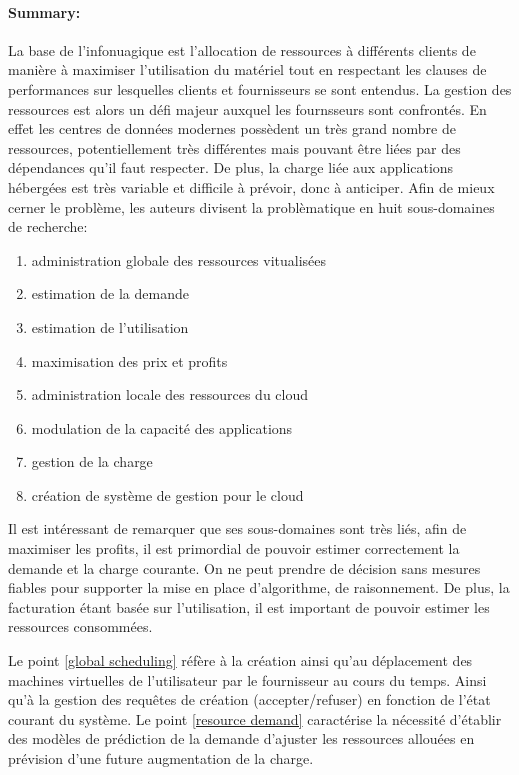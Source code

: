 \documentclass[11pt]{article}
\begin{document}
\paragraph{Summary:}
La base de l'infonuagique est l'allocation de ressources à différents clients de manière à maximiser l'utilisation du matériel tout en respectant les clauses de 
performances sur lesquelles clients et fournisseurs se sont entendus. La gestion des ressources est alors un défi majeur auxquel les fournsseurs sont confrontés. En effet
les centres de données modernes possèdent un très grand nombre de ressources, potentiellement très différentes mais pouvant être liées par des dépendances qu'il faut
respecter. De plus, la charge liée aux applications hébergées est très variable et difficile à prévoir, donc à anticiper. Afin de mieux cerner le problème, les auteurs 
divisent la problèmatique en huit sous-domaines de recherche:
\begin{enumerate}
	\item\label{global scheduling}  administration globale des ressources vitualisées
	\item\label{resource demand}estimation de la demande
	\item\label{resource utilization}estimation de l'utilisation
	\item\label{resource pricing}maximisation des prix et profits
	\item\label{local scheduling}administration locale des ressources du cloud
	\item\label{application scaling}modulation de la capacité des applications
	\item\label{workload management}gestion de la charge
	\item\label{cloud management}création de système de gestion pour le cloud
\end{enumerate}
Il est intéressant de remarquer que ses sous-domaines sont très liés, afin de maximiser les profits, il est primordial de pouvoir estimer correctement la demande et la
charge courante. On ne peut prendre de décision sans mesures fiables pour supporter la mise en place d'algorithme, de raisonnement. De plus, la facturation étant basée 
sur l'utilisation, il est important de pouvoir estimer les ressources consommées.

Le point \ref{global scheduling} réfère à la création ainsi qu'au déplacement des machines virtuelles de l'utilisateur par le fournisseur au cours du temps.
Ainsi qu'à la gestion des requêtes de création (accepter/refuser) en fonction de l'état courant du système. Le point \ref{resource demand} caractérise la 
nécessité d'établir des modèles de prédiction de la demande d'ajuster les ressources allouées en prévision d'une future augmentation de la charge.
\end{document}
